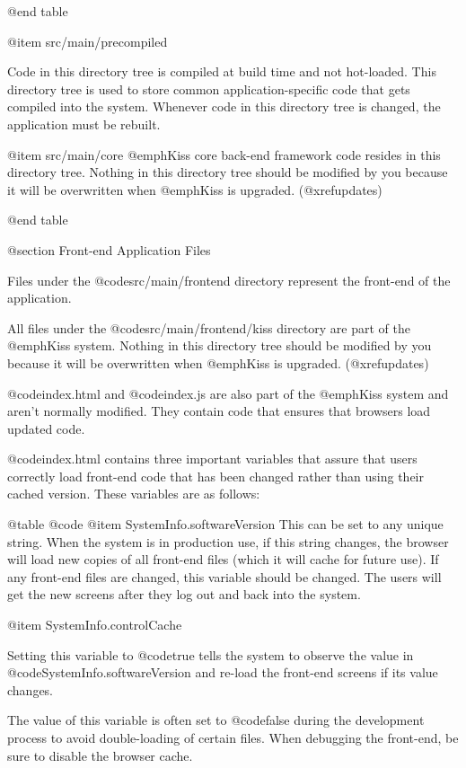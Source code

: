@end table

@item src/main/precompiled

Code in this directory tree is compiled at build time and not hot-loaded.  This directory tree is used to
store common application-specific code that gets compiled into the system.  Whenever code in this directory tree
is changed, the application must be rebuilt.

@item src/main/core
@emph{Kiss} core back-end framework code resides in this directory tree. Nothing in this directory tree should be 
modified by you because it will be overwritten when @emph{Kiss} is upgraded.  (@xref{updates})

@end table


@section Front-end Application Files

Files under the @code{src/main/frontend} directory represent the
front-end of the application.

All files under the @code{src/main/frontend/kiss} directory are part of
the @emph{Kiss} system.  Nothing in this directory tree should be 
modified by you because it will be overwritten when @emph{Kiss} is upgraded.  (@xref{updates})

@code{index.html} and @code{index.js} are also part of the @emph{Kiss}
system and aren't normally modified.  They contain code that ensures
that browsers load updated code.

@code{index.html} contains three important variables that assure that users correctly load 
front-end code that has been changed rather than using their cached version.  These variables are as follows:

@table @code
@item SystemInfo.softwareVersion
This can be set to any unique string.  When the system is in production use, if this string changes,
the browser will load new copies of all front-end files (which it will cache for future use).
If any front-end files are changed, this variable should be changed.  The users will get the new screens 
after they log out and back into the system.

@item SystemInfo.controlCache

Setting this variable to @code{true} tells the system to observe the value in @code{SystemInfo.softwareVersion}
and re-load the front-end screens if its value changes.

The value of this variable is often set to @code{false} during the development process to avoid double-loading
of certain files.   When debugging the front-end, be sure to disable the browser cache.

